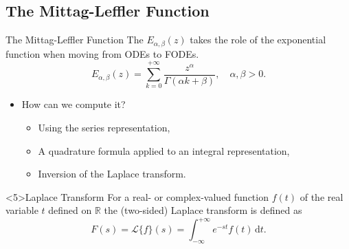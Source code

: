 \documentclass[aspectratio=169,xcolor=dvipsnames]{beamer}
\begin{document}
\subsection{The Mittag-Leffler Function}

\begin{frame}{The Mittag-Leffler Function}
The $E_{\alpha,\beta}(z)$ takes the role of the exponential function when moving from ODEs to FODEs.
\[
E_{\alpha,\beta}(z) = \sum_{k=0}^{+\infty} \frac{z^\alpha}{\Gamma(\alpha k + \beta)}, \quad \alpha,\beta > 0.
\]
\begin{itemize}
	\item[\faQuestionCircle] How can we compute it?
	\begin{itemize}
		\item<2->[\faDoorClosed] Using the series representation,
		\item<3->[\faDoorClosed] A quadrature formula applied to an integral representation,
		\item<4->[\only<4>{\faDoorClosed}\only<5>{\faDoorOpen}] Inversion of the Laplace transform.
	\end{itemize}
\end{itemize}
\begin{block}<5>{Laplace Transform}
For a real- or complex-valued function $f(t)$ of the real variable $t$ defined on $\mathbb{R}$ the (two-sided) Laplace transform is defined as
\[
F(s) = \mathcal{L}\{f\}(s) = \int_{-\infty}^{+\infty} e^{-st} f(t)\,\textrm{d}t.
\]
\end{block}
\end{frame}
\end{document}
